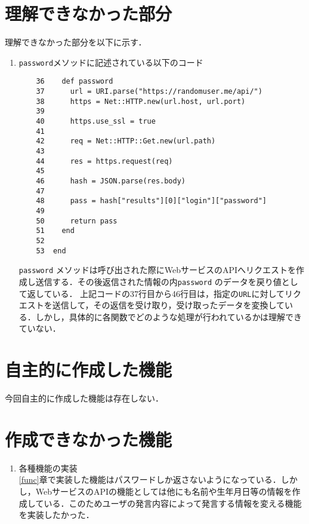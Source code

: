 \documentclass[12pt]{jsarticle}
\begin{document}
\section{理解できなかった部分}\label{sec3}
理解できなかった部分を以下に示す．
\begin{enumerate}
\item \verb|password|メソッドに記述されている以下のコード  
\begin{verbatim}
    36	  def password
    37	    url = URI.parse("https://randomuser.me/api/")
    38	    https = Net::HTTP.new(url.host, url.port)
    39	
    40	    https.use_ssl = true
    41	
    42	    req = Net::HTTP::Get.new(url.path)
    43	
    44	    res = https.request(req)
    45	
    46	    hash = JSON.parse(res.body)
    47	
    48	    pass = hash["results"][0]["login"]["password"] 
    49	
    50	    return pass
    51	  end
    52	  
    53	end
\end{verbatim}
\verb|password| メソッドは呼び出された際にWebサービスのAPIへリクエストを作成し送信する．その後返信された情報の内\verb|password| のデータを戻り値として返している．
上記コードの37行目から46行目は，指定の\verb|URL|に対してリクエストを送信して，その返信を受け取り，受け取ったデータを変換している．しかし，具体的に各関数でどのような処理が行われているかは理解できていない．
\end{enumerate}
   
\section{自主的に作成した機能}\label{sec4}
今回自主的に作成した機能は存在しない．

\section{作成できなかった機能}\label{sec5}
\begin{enumerate}
\item 各種機能の実装\\
  \ref{func}章で実装した機能はパスワードしか返さないようになっている．しかし，WebサービスのAPIの機能としては他にも名前や生年月日等の情報を作成している．このためユーザの発言内容によって発言する情報を変える機能を実装したかった．
\end{enumerate}


\end{document}
